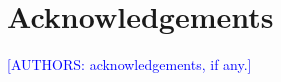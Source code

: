 \documentclass[preprint,11pt,authoryear]{elsarticle}
\newcommand{\authorpend}[1]{\textcolor{blue}{[AUTHORS: #1]}}   %
\begin{document}
\section*{Acknowledgements}
\authorpend{acknowledgements, if any.}

\begin{singlespace}   %


\end{singlespace}
\end{document}
